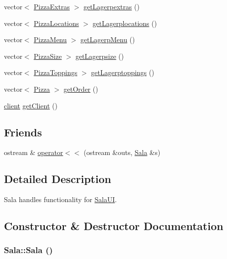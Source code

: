 \begin{CompactItemize}
vector$<$ \hyperlink{class_pizza_extras}{Pizza\-Extras} $>$ \hyperlink{class_sala_49f231948b80188691882a8624a4612d}{get\-Lagerpextras} ()
\item 
vector$<$ \hyperlink{class_pizza_locations}{Pizza\-Locations} $>$ \hyperlink{class_sala_1e720a42845186f5057b36ab8b69711a}{get\-Lagerplocations} ()
\item 
vector$<$ \hyperlink{class_pizza_menu}{Pizza\-Menu} $>$ \hyperlink{class_sala_89b38b3e2a9835524c9fd21628f485cc}{get\-Lagerp\-Menu} ()
\item 
vector$<$ \hyperlink{class_pizza_size}{Pizza\-Size} $>$ \hyperlink{class_sala_3b0fc00a14ac87f5c78a4ec2f508d67b}{get\-Lagerpsize} ()
\item 
vector$<$ \hyperlink{class_pizza_toppings}{Pizza\-Toppings} $>$ \hyperlink{class_sala_aeb754b87d63d395a61539294cbdf064}{get\-Lagerptoppings} ()
\item 
vector$<$ \hyperlink{class_pizza}{Pizza} $>$ \hyperlink{class_sala_71e41a58a2a9c2d1927676693909a42c}{get\-Order} ()
\item 
\hyperlink{classclient}{client} \hyperlink{class_sala_a1300ce1d3137fc3bd1b2938612faa1b}{get\-Client} ()
\end{CompactItemize}
\subsection*{Friends}
\begin{CompactItemize}
\item 
ostream \& \hyperlink{class_sala_b32b27b19243c1cf7bcfffe604ea1736}{operator$<$$<$} (ostream \&outs, \hyperlink{class_sala}{Sala} \&s)
\end{CompactItemize}


\subsection{Detailed Description}
Sala handles functionality for \hyperlink{class_sala_u_i}{Sala\-UI}. 



\subsection{Constructor \& Destructor Documentation}
\hypertarget{class_sala_da283dd136f3f0c2703d0356f49c1e6e}{
\subsubsection[Sala]{\setlength{\rightskip}{0pt plus 5cm}Sala::Sala ()}}
\label{class_sala_da283dd136f3f0c2703d0356f49c1e6e}


